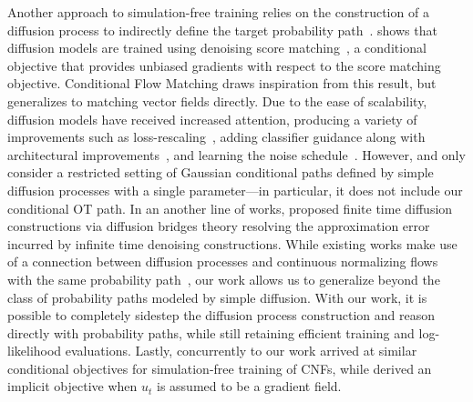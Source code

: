 \documentclass{article}
\newcommand{\yl}[1]{{\color{magenta}{\bf[Yaron:} #1{\bf]}}}
\def\eqref#1{equation~\ref{#1}}
\begin{document}
Another approach to simulation-free training relies on the construction of a diffusion process to indirectly define the target probability path~\citep{sohl2015deep,ho2020denoising,song2019score}.
\citet{song2020score} shows that diffusion models are trained using denoising score matching~\citep{vincent2011connection}, a conditional objective that provides unbiased gradients with respect to the score matching objective. 
Conditional Flow Matching draws inspiration from this result, but generalizes to matching vector fields directly.
Due to the ease of scalability, diffusion models have received increased attention, producing a variety of improvements such as loss-rescaling~\citep{song2021maximum}, adding classifier guidance along with architectural improvements~\citep{dhariwal2021diffusion}, and learning the noise schedule~\citep{nichol2021improved,kingma2021vdm}. However, \citep{nichol2021improved} and \citep{kingma2021vdm} only consider a restricted setting of Gaussian conditional paths defined by simple diffusion processes with a single parameter---in particular, it does not include our conditional OT path.
%
{In an another line of works, \citep{DeBortoli2021schscore, wang2021schbridges,peluchetti2021non} proposed finite time diffusion constructions via diffusion bridges theory resolving the approximation error incurred by infinite time denoising constructions.}
%
While existing works make use of a connection between diffusion processes and continuous normalizing flows with the same probability path~\citep{maoutsa2020interacting,song2020score,song2021maximum}, our work allows us to generalize beyond the class of probability paths modeled by simple diffusion.
With our work, it is possible to completely sidestep the diffusion process construction and reason directly with probability paths, while still retaining efficient training and log-likelihood evaluations.  Lastly, concurrently to our work \citep{liu2022flow,albergo2022building} arrived at similar conditional objectives for simulation-free training of CNFs, while \citet{neklyudov2023action} derived an implicit objective when $u_t$ is assumed to be a gradient field.


\end{document}
